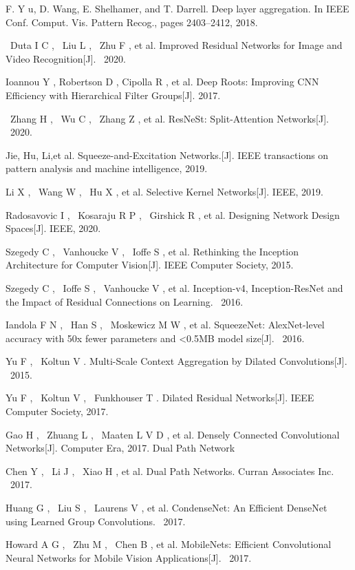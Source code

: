 \documentclass[15pt]{article}
\begin{document}
\begin{thebibliography}{99}
 F. Y u, D. Wang, E. Shelhamer, and T. Darrell. Deep layer aggregation. In IEEE Conf. Comput. Vis. Pattern Recog., pages 2403–2412, 2018.

 Duta I C ,  Liu L ,  Zhu F , et al. Improved Residual Networks for Image and Video Recognition[J].  2020.

 Ioannou Y , Robertson D , Cipolla R , et al. Deep Roots: Improving CNN Efficiency with Hierarchical Filter Groups[J]. 2017.

 Zhang H ,  Wu C ,  Zhang Z , et al. ResNeSt: Split-Attention Networks[J].  2020.

 Jie, Hu, Li,et al. Squeeze-and-Excitation Networks.[J]. IEEE transactions on pattern analysis and machine intelligence, 2019.

 Li X ,  Wang W ,  Hu X , et al. Selective Kernel Networks[J]. IEEE, 2019.

 Radosavovic I ,  Kosaraju R P ,  Girshick R , et al. Designing Network Design Spaces[J]. IEEE, 2020.

 Szegedy C ,  Vanhoucke V ,  Ioffe S , et al. Rethinking the Inception Architecture for Computer Vision[J]. IEEE Computer Society, 2015.

 Szegedy C ,  Ioffe S ,  Vanhoucke V , et al. Inception-v4, Inception-ResNet and the Impact of Residual Connections on Learning.  2016.

 Iandola F N ,  Han S ,  Moskewicz M W , et al. SqueezeNet: AlexNet-level accuracy with 50x fewer parameters and <0.5MB model size[J].  2016.

 Yu F ,  Koltun V . Multi-Scale Context Aggregation by Dilated Convolutions[J].  2015.

 Yu F ,  Koltun V ,  Funkhouser T . Dilated Residual Networks[J]. IEEE Computer Society, 2017.

 Gao H ,  Zhuang L ,  Maaten L V D , et al. Densely Connected Convolutional Networks[J]. Computer Era, 2017. Dual Path Network  

 Chen Y ,  Li J ,  Xiao H , et al. Dual Path Networks. Curran Associates Inc.  2017.

 Huang G ,  Liu S ,  Laurens V , et al. CondenseNet: An Efficient DenseNet using Learned Group Convolutions.  2017.

 Howard A G ,  Zhu M ,  Chen B , et al. MobileNets: Efficient Convolutional Neural Networks for Mobile Vision Applications[J].  2017.


\end{thebibliography}
\end{document}
